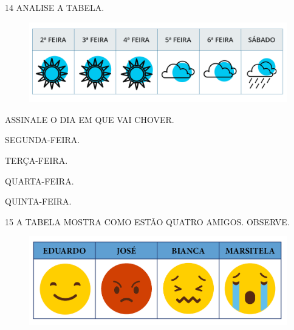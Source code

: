 
\num{14} ANALISE A TABELA. 


\begin{figure}[H]
\includegraphics[width=\textwidth]{./media/SAEB_1ANO_MAT_FIGURA127.png}
\end{figure}

ASSINALE O DIA EM QUE VAI CHOVER.

\begin{escolha}%
\item SEGUNDA-FEIRA.

\item TERÇA-FEIRA.

\item QUARTA-FEIRA.

\item QUINTA-FEIRA.
\end{escolha}

\num{15} A TABELA MOSTRA COMO ESTÃO QUATRO AMIGOS. OBSERVE.


\begin{figure}[H]
\includegraphics[width=\textwidth]{./media/SAEB_1ANO_MAT_FIGURA128.png}
\end{figure}

